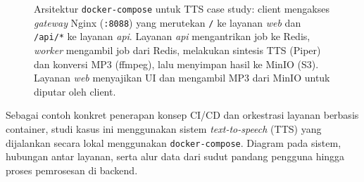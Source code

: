 \begin{figure}[htbp]
{{%
}
}
\caption{Arsitektur \texttt{docker-compose} untuk TTS case study: client mengakses \textit{gateway} Nginx (\texttt{:8088}) yang merutekan \texttt{/} ke layanan \textit{web} dan \texttt{/api/*} ke layanan \textit{api}. Layanan \textit{api} mengantrikan job ke Redis, \textit{worker} mengambil job dari Redis, melakukan sintesis TTS (Piper) dan konversi MP3 (ffmpeg), lalu menyimpan hasil ke MinIO (S3). Layanan \textit{web} menyajikan UI dan mengambil MP3 dari MinIO untuk diputar oleh client.}
\label{fig:tts-compose-architecture}
\end{figure}




Sebagai contoh konkret penerapan konsep CI/CD dan orkestrasi layanan berbasis
container, studi kasus ini menggunakan sistem \textit{text-to-speech} (TTS)
yang dijalankan secara lokal menggunakan \texttt{docker-compose}. Diagram pada
sistem, hubungan antar layanan, serta alur data dari sudut pandang pengguna
hingga proses pemrosesan di backend.

